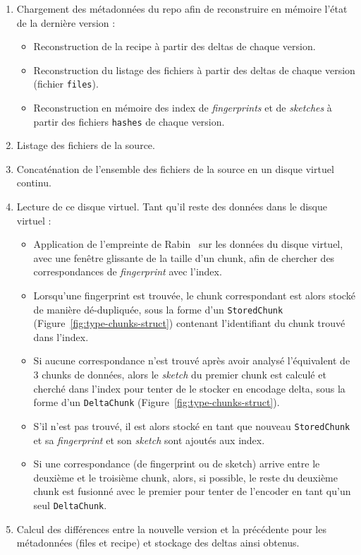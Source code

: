 \documentclass[a4paper]{report}
\begin{document}
\begin{enumerate}
\item
  Chargement des métadonnées du repo afin de reconstruire en
  mémoire l'état de la dernière version :

  \begin{itemize}
  \item
    Reconstruction de la recipe à partir des deltas de chaque
    version.
  \item
    Reconstruction du listage des fichiers à partir des deltas de chaque
    version (fichier \verb|files|).
  \item
    Reconstruction en mémoire des index de \emph{fingerprints} et
    de \emph{sketches} à partir des fichiers \verb|hashes| de chaque
    version.
  \end{itemize}
\item
  Listage des fichiers de la source.
\item
  Concaténation de l'ensemble des fichiers de la source en un disque
  virtuel continu.
\item
  Lecture de ce disque virtuel. Tant qu'il reste des données dans le disque virtuel :
  
  \begin{itemize}
  \item
    Application de l'empreinte de Rabin~\cite{rabin1981fingerprinting}
    sur les données du disque virtuel, avec une fenêtre glissante de la taille d'un chunk,
    afin de chercher des correspondances de \emph{fingerprint} avec l'index.
  \item
    Lorsqu'une fingerprint est trouvée, le chunk correspondant est alors
    stocké de manière dé-dupliquée, sous la forme d'un \verb|StoredChunk|
    (Figure~\ref{fig:type-chunks-struct})
    contenant l'identifiant du chunk trouvé dans l'index.
  \item
    Si aucune correspondance n'est trouvé après avoir analysé
    l'équivalent de 3 chunks de données,
    alors le \emph{sketch} du premier chunk est calculé et cherché dans l'index
    pour tenter de le stocker en encodage delta, sous la forme d'un \verb|DeltaChunk|
    (Figure~\ref{fig:type-chunks-struct}).
  \item
    S'il n'est pas trouvé, il est alors stocké en tant que nouveau \verb|StoredChunk|
    et sa \emph{fingerprint} et son \emph{sketch} sont ajoutés aux index.
  \item
    Si une correspondance (de fingerprint ou de sketch) arrive entre le deuxième
    et le troisième chunk, alors, si possible, le reste du deuxième chunk est
    fusionné avec le premier pour tenter de l'encoder en tant qu'un seul \verb|DeltaChunk|.
  \end{itemize}
\item
  Calcul des différences entre la nouvelle version et la précédente pour
  les métadonnées (files et recipe) et stockage des deltas ainsi obtenus.
\end{enumerate}
\end{document}
